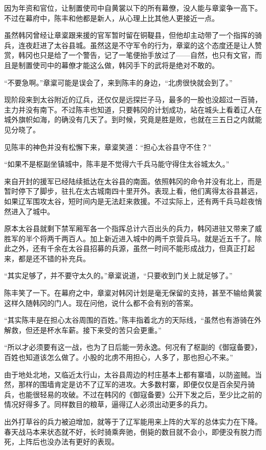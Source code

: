 因为年资和官位，让制置使司中自黄裳以下的所有幕僚，没人能与章楶争一高下。不过在幕府中，陈丰和他都是新人，从心理上比其他人更接近一点。

虽然韩冈曾经让章楶跟来援的官军暂时留在铜鞮县，但他却主动带了一个指挥的骑兵，连夜赶进了太谷县城。虽然这是不守军令的行为，章楶的这个态度还是让人赞赏，韩冈也只是给了一个警告，记了一笔便抬手放过了——自然，也只有文官，而且是制置使司中的幕僚才能这么做，韩冈手下的武将是绝对不敢的。

“不要急啊。”章楶可能是误会了，来到陈丰的身边，“北虏很快就会到了。”

现阶段来到太谷附近的辽兵，还仅仅是远探拦子马，最多的一股也没超过一百骑，主力并没有南下。不过陈丰也知道，只要韩冈的计划成功，站在城头上看着辽人在城外旗帜如海，的确没有几天了。到时候，究竟是胜是败，也就在三五日之内就能见分晓了。

见陈丰的神色并没有松懈下来，章楶笑道：“担心太谷县守不住？”

“如果不是枢副坐镇城中，陈丰是不觉得六千兵马能守得住太谷城太久。”

来自开封的援军已经陆续抵达在太谷县的南面。依照韩冈的命令并没有北上，而是暂时停下了脚步，驻扎在太古城南四十里开外。表现上看，他们离得太谷县甚远，如果辽军围攻太谷，短时间内是无法赶来救援。不过实际上，还有两千兵马趁夜悄然进入了城中。

原本太谷县就剩下禁军厢军各一个指挥总计六百出头的兵力，韩冈进驻又带来了威胜军的半个将两千两百人。加上新近进入城中的两千京营兵马。就是近五千了。除此之外，还有千余在太谷县招募的兵源，虽然一时间不能形成战力，但真正打起来，都是还不错的补充兵。

“其实足够了，并不要守太久的。”章楶说道，“只要收到门关上就足够了。”

陈丰笑了一下。在幕府之中，章楶对韩冈计划是毫无保留的支持，甚至不输给黄裳这样久随韩冈的门人。现在问他，说什么都不会有别的答案。

“其实陈丰是在担心太谷周围的百姓。”陈丰指着北方的天际线，“虽然也有游骑在外解救，但还是杯水车薪。接下来受的苦只会更重。”

“所以才必须要有这一战，也为了日后能一劳永逸。何况有了枢副的《御寇备要》，百姓也知道该怎么做了。小股的北虏不用担心，人多了，那也担心不来。”

由于地处北地，又临近太行山，太谷县周边的村庄基本上都有寨墙，以防盗贼。当然，那样的围墙肯定是访不了辽军的进攻。大多数村寨，即便仅仅是百余契丹骑兵，也能很轻易的攻破。不过在韩冈的《御寇备要》公开下发之后，至少比之前的情况好得多了。同样数目的粮草，逼得辽人必须出动更多的兵力。

出外打草谷的兵力被迫增加，就等于了辽军能用来上阵的大军的总体实力在下降。春天战马本来状态就不好，长时骑乘奔驰，倒毙的数目就不会小，即便没有脱力而死，上阵后也没办法有更好的表现。

